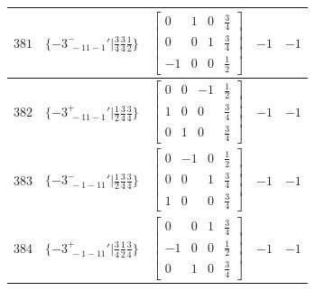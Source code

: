 \documentclass[fleqn,8pt]{jsarticle}
\begin{document}
\begin{longtable}{ccccc}
$ 381 $ & $ \{-3^{-}_{\,\,-11-1}{}'|\frac{3}{4} \frac{3}{4} \frac{1}{2}\} $ & $ \begin{bmatrix} 0 & 1 & 0 & \frac{3}{4} \\ 0 & 0 & 1 & \frac{3}{4} \\ -1 & 0 & 0 & \frac{1}{2} \end{bmatrix} $ & $ -1 $ & $ -1 $ \\ \hline
$ 382 $ & $ \{-3^{+}_{\,\,-11-1}{}'|\frac{1}{2} \frac{3}{4} \frac{3}{4}\} $ & $ \begin{bmatrix} 0 & 0 & -1 & \frac{1}{2} \\ 1 & 0 & 0 & \frac{3}{4} \\ 0 & 1 & 0 & \frac{3}{4} \end{bmatrix} $ & $ -1 $ & $ -1 $ \\ \hline
$ 383 $ & $ \{-3^{-}_{\,\,-1-11}{}'|\frac{1}{2} \frac{3}{4} \frac{3}{4}\} $ & $ \begin{bmatrix} 0 & -1 & 0 & \frac{1}{2} \\ 0 & 0 & 1 & \frac{3}{4} \\ 1 & 0 & 0 & \frac{3}{4} \end{bmatrix} $ & $ -1 $ & $ -1 $ \\ \hline
$ 384 $ & $ \{-3^{+}_{\,\,-1-11}{}'|\frac{3}{4} \frac{1}{2} \frac{3}{4}\} $ & $ \begin{bmatrix} 0 & 0 & 1 & \frac{3}{4} \\ -1 & 0 & 0 & \frac{1}{2} \\ 0 & 1 & 0 & \frac{3}{4} \end{bmatrix} $ & $ -1 $ & $ -1 $ \\
\end{longtable}
\end{document}
